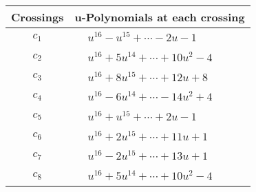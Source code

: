 \documentclass[1p]{elsarticle_modified}
\theoremstyle{definition}
\begin{document}
\begin{tabular}{m{50pt}|m{274pt}}
Crossings & \hspace{64pt}u-Polynomials at each crossing \\
\hline $$\begin{aligned}c_{1}\end{aligned}$$&$\begin{aligned}
&u^{16}- u^{15}+\cdots-2 u-1
\end{aligned}$\\
\hline $$\begin{aligned}c_{2}\end{aligned}$$&$\begin{aligned}
&u^{16}+5 u^{14}+\cdots+10 u^2-4
\end{aligned}$\\
\hline $$\begin{aligned}c_{3}\end{aligned}$$&$\begin{aligned}
&u^{16}+8 u^{15}+\cdots+12 u+8
\end{aligned}$\\
\hline $$\begin{aligned}c_{4}\end{aligned}$$&$\begin{aligned}
&u^{16}-6 u^{14}+\cdots-14 u^2+4
\end{aligned}$\\
\hline $$\begin{aligned}c_{5}\end{aligned}$$&$\begin{aligned}
&u^{16}+u^{15}+\cdots+2 u-1
\end{aligned}$\\
\hline $$\begin{aligned}c_{6}\end{aligned}$$&$\begin{aligned}
&u^{16}+2 u^{15}+\cdots+11 u+1
\end{aligned}$\\
\hline $$\begin{aligned}c_{7}\end{aligned}$$&$\begin{aligned}
&u^{16}-2 u^{15}+\cdots+13 u+1
\end{aligned}$\\
\hline $$\begin{aligned}c_{8}\end{aligned}$$&$\begin{aligned}
&u^{16}+5 u^{14}+\cdots+10 u^2-4
\end{aligned}$\\

\end{tabular}
\end{document}
